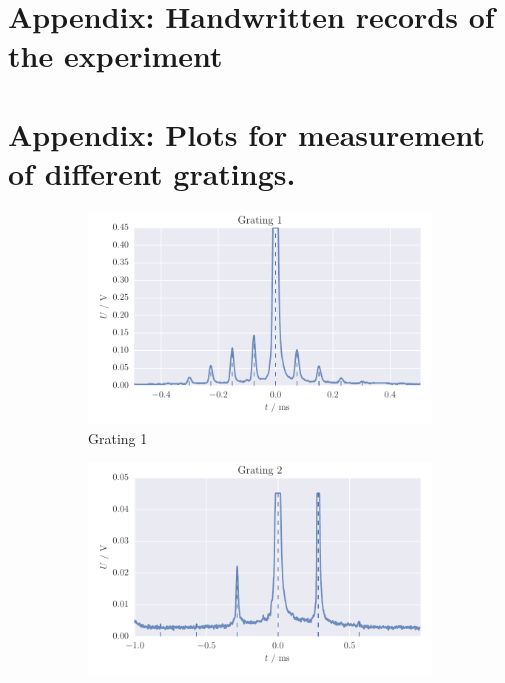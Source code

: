 \section{Appendix: Handwritten records of the experiment}
\label{sec:records}
\FloatBarrier

\section{Appendix: Plots for measurement of different gratings.}
\label{sec:appendix_gratings_plots}
\begin{figure}[H]
    \centering
    \begin{subfigure}[b]{\mpltw}
        \includegraphics[width=\textwidth]{figures/gratings_maxi1}
        \caption{Grating 1}
        \label{fig:gratings_maxi1}
    \end{subfigure}\quad
    \begin{subfigure}[b]{\mpltw}
        \includegraphics[width=\textwidth]{figures/gratings_maxi2}

\end{subfigure}
\end{figure}
